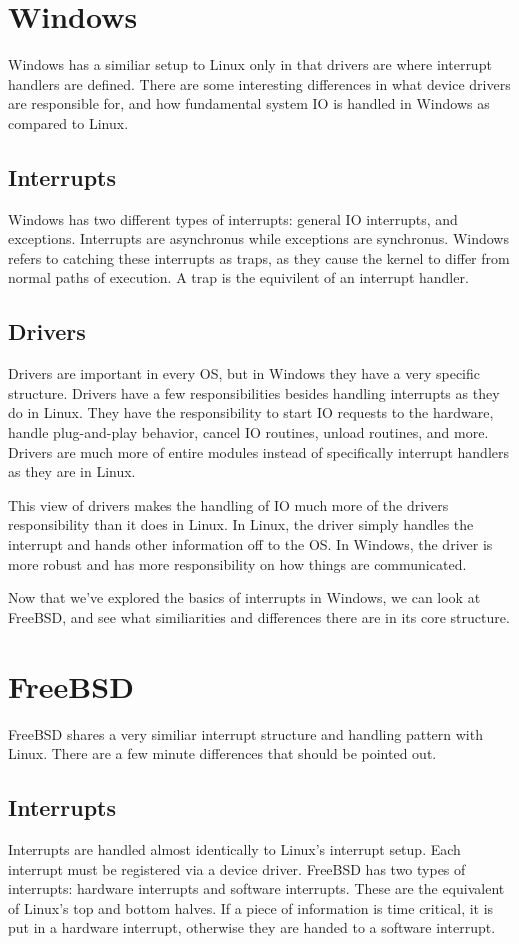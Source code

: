 \documentclass[10pt,letterpaper,onecolumn,draftclsnofoot]{IEEEtran}
\begin{document}
  \section{Windows}
  Windows has a similiar setup to Linux only in that drivers are where interrupt
  handlers are defined. There are some interesting differences in what device
  drivers are responsible for, and how fundamental system IO is handled in Windows
  as compared to Linux.
  \subsection{Interrupts}
  Windows has two different types of interrupts: general IO interrupts, and
  exceptions. Interrupts are asynchronus while exceptions are synchronus. Windows
  refers to catching these interrupts as traps, as they cause the kernel to differ
  from normal paths of execution. A trap is the equivilent of an interrupt handler.
  \cite{internals1}
  \subsection{Drivers}
  Drivers are important in every OS, but in Windows they have a very specific
  structure. Drivers have a few responsibilities besides handling interrupts as
  they do in Linux. They have the responsibility to start IO requests to the hardware,
  handle plug-and-play behavior, cancel IO routines, unload routines, and more.
  Drivers are much more of entire modules instead of specifically interrupt handlers
  as they are in Linux. \cite{internals2}

  This view of drivers makes the handling of IO much more of the drivers responsibility
  than it does in Linux. In Linux, the driver simply handles the interrupt and hands
  other information off to the OS. In Windows, the driver is more robust and has
  more responsibility on how things are communicated.

  Now that we've explored the basics of interrupts in Windows, we can look at
  FreeBSD, and see what similiarities and differences there are in its core structure.

  \section{FreeBSD}
  FreeBSD shares a very similiar interrupt structure and handling pattern with
  Linux. There are a few minute differences that should be pointed out.
  \subsection{Interrupts}
  Interrupts are handled almost identically to Linux's interrupt setup. Each
  interrupt must be registered via a device driver. FreeBSD has two types of
  interrupts: hardware interrupts and software interrupts. These are the equivalent
  of Linux's top and bottom halves. If a piece of information is time critical,
  it is put in a hardware interrupt, otherwise they are handed to a software
  interrupt. \cite{freebsd2016}
\end{document}
